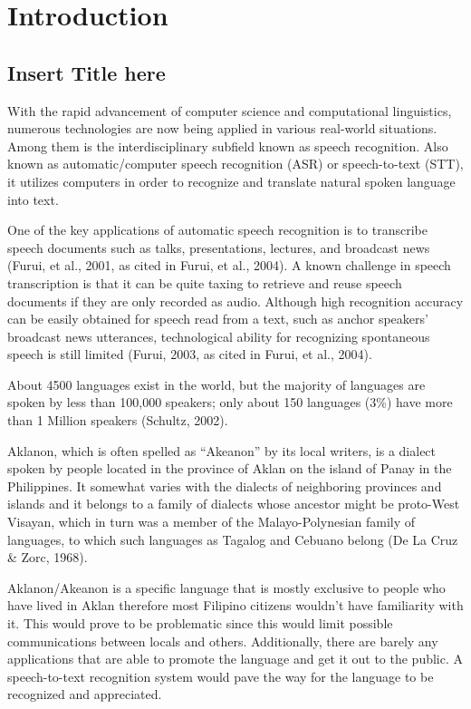 \chapter{Introduction}

\section{Insert Title here}

With the rapid advancement of computer science and computational linguistics, numerous technologies are now being applied in various real-world situations. Among them is the interdisciplinary subfield known as speech recognition. Also known as automatic/computer speech recognition (ASR) or speech-to-text (STT), it utilizes computers in order to recognize and translate natural spoken language into text.

One of the key applications of automatic speech recognition is to transcribe speech documents such as talks, presentations, lectures, and broadcast news (Furui, et al., 2001, as cited in Furui, et al., 2004). A known challenge in speech transcription is that it can be quite taxing to retrieve and reuse speech documents if they are only recorded as audio. Although high recognition accuracy can be easily obtained for speech read from a text, such as anchor speakers’ broadcast news utterances, technological ability for recognizing spontaneous speech is still limited (Furui, 2003, as cited in Furui, et al., 2004).

About 4500 languages exist in the world, but the majority of languages are spoken by less than 100,000 speakers; only about 150 languages (3\%) have more than 1 Million speakers (Schultz, 2002).

Aklanon, which is often spelled as “Akeanon” by its local writers, is a dialect spoken by people located in the province of Aklan on the island of Panay in the Philippines. It somewhat varies with the dialects of neighboring provinces and islands and it belongs to a family of dialects whose ancestor might be proto-West Visayan, which in turn was a member of the Malayo-Polynesian family of languages, to which such languages as Tagalog and Cebuano belong (De La Cruz \& Zorc, 1968).

Aklanon/Akeanon is a specific language that is mostly exclusive to people who have lived in Aklan therefore most Filipino citizens wouldn’t have familiarity with it. This would prove to be problematic since this would limit possible communications between locals and others. Additionally, there are barely any applications that are able to promote the language and get it out to the public. A speech-to-text recognition system would pave the way for the language to be recognized and appreciated.

